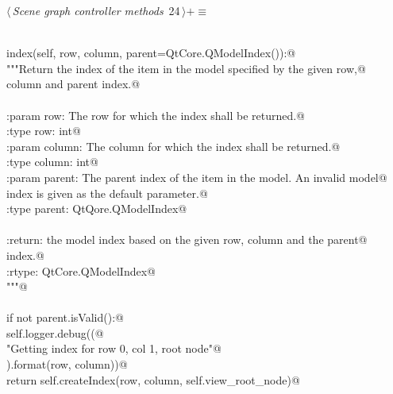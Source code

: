 \documentclass[
    a4paper,      %
    10pt,         %
    openright,    %
    notitlepage,  %
    parskip=half, %
]{scrreprt}       %
\theoremstyle{definition}                    %
\begin{document}
\begin{flushleft} \small
\begin{minipage}{\linewidth}\label{scrap22}\raggedright\small
{} $\langle\,${\itshape Scene graph controller methods}\nobreak\ {\footnotesize {24}}$\,\rangle+\equiv$
\vspace{-1ex}
\begin{list}{}{} \item
\mbox{}\lstinline@@\\
\mbox{}\lstinline@def index(self, row, column, parent=QtCore.QModelIndex()):@\\
\mbox{}\lstinline@    """Return the index of the item in the model specified by the given row,@\\
\mbox{}\lstinline@    column and parent index.@\\
\mbox{}\lstinline@@\\
\mbox{}\lstinline@    :param row: The row for which the index shall be returned.@\\
\mbox{}\lstinline@    :type  row: int@\\
\mbox{}\lstinline@    :param column: The column for which the index shall be returned.@\\
\mbox{}\lstinline@    :type column: int@\\
\mbox{}\lstinline@    :param parent: The parent index of the item in the model. An invalid model@\\
\mbox{}\lstinline@                   index is given as the default parameter.@\\
\mbox{}\lstinline@    :type parent: QtQore.QModelIndex@\\
\mbox{}\lstinline@@\\
\mbox{}\lstinline@    :return: the model index based on the given row, column and the parent@\\
\mbox{}\lstinline@             index.@\\
\mbox{}\lstinline@    :rtype: QtCore.QModelIndex@\\
\mbox{}\lstinline@    """@\\
\mbox{}\lstinline@@\\
\mbox{}\lstinline@    if not parent.isValid():@\\
\mbox{}\lstinline@        self.logger.debug((@\\
\mbox{}\lstinline@            "Getting index for row {0}, col {1}, root node"@\\
\mbox{}\lstinline@        ).format(row, column))@\\
\mbox{}\lstinline@        return self.createIndex(row, column, self.view_root_node)@\\

\end{list}
\end{minipage}
\end{flushleft}
\end{document}
